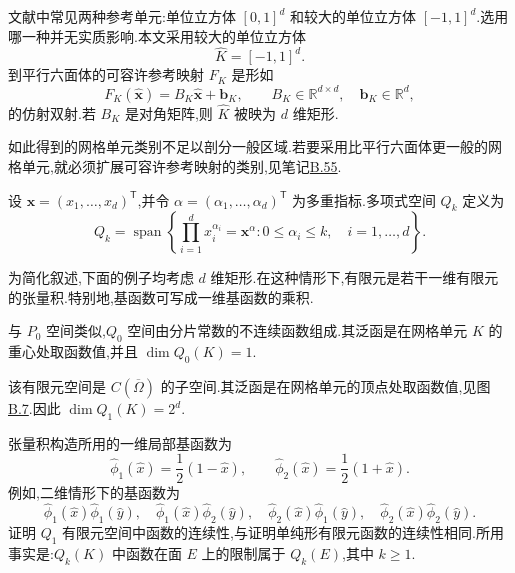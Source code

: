 \begin{note}[参考网格单元与到平行六面体的参考映射]\label{note:appendix-b-46}
文献中常见两种参考单元:单位立方体 $[0,1]^d$ 和较大的单位立方体 $[-1,1]^d$.选用哪一种并无实质影响.本文采用较大的单位立方体
\[
 \widehat K=[-1,1]^d.
\]
到平行六面体的可容许参考映射 $F_K$ 是形如
\[
 F_K(\widehat{\bm x})=B_K\widehat{\bm x}+\bm b_K,
 \qquad B_K\in\mathbb R^{d\times d},\quad \bm b_K\in\mathbb R^d,
\]
的仿射双射.若 $B_K$ 是对角矩阵,则 $\widehat K$ 被映为 $d$ 维矩形.

如此得到的网格单元类别不足以剖分一般区域.若要采用比平行六面体更一般的网格单元,就必须扩展可容许参考映射的类别,见笔记\hyperref[note:appendix-b-55]{B.55}.
\end{note}

\begin{definition}[多项式空间 $Q_k$]\label{def:appendix-b-47}
设 $\bm x=(x_1,\ldots,x_d)^{\mathsf T}$,并令
$\alpha=(\alpha_1,\ldots,\alpha_d)^{\mathsf T}$ 为多重指标.多项式空间 $Q_k$ 定义为
\[
 Q_k=\operatorname{span}\left\{
 \prod_{i=1}^d x_i^{\alpha_i}=\bm x^\alpha:
 0\le\alpha_i\le k,\quad i=1,\ldots,d
 \right\}.
\]
\end{definition}

\begin{note}\label{note:appendix-b-48}
为简化叙述,下面的例子均考虑 $d$ 维矩形.在这种情形下,有限元是若干一维有限元的张量积.特别地,基函数可写成一维基函数的乘积.
\end{note}

\begin{example}[$Q_0$:分片常数有限元]\label{ex:appendix-b-49}
与 $P_0$ 空间类似,$Q_0$ 空间由分片常数的不连续函数组成.其泛函是在网格单元 $K$ 的重心处取函数值,并且
$\dim Q_0(K)=1$.
\end{example}

\begin{example}\label{ex:appendix-b-50}
该有限元空间是 $C(\overline\Omega)$ 的子空间.其泛函是在网格单元的顶点处取函数值,见图\hyperref[fig:appendix-b-7]{B.7}.因此
$\dim Q_1(K)=2^d$.

张量积构造所用的一维局部基函数为
\[
 \widehat\phi_1(\widehat x)=\frac12(1-\widehat x),\qquad
 \widehat\phi_2(\widehat x)=\frac12(1+\widehat x).
\]
例如,二维情形下的基函数为
\[
 \widehat\phi_1(\widehat x)\widehat\phi_1(\widehat y),\quad
 \widehat\phi_1(\widehat x)\widehat\phi_2(\widehat y),\quad
 \widehat\phi_2(\widehat x)\widehat\phi_1(\widehat y),\quad
 \widehat\phi_2(\widehat x)\widehat\phi_2(\widehat y).
\]
证明 $Q_1$ 有限元空间中函数的连续性,与证明单纯形有限元函数的连续性相同.所用事实是:$Q_k(K)$ 中函数在面 $E$ 上的限制属于 $Q_k(E)$,其中 $k\ge1$.
\end{example}

